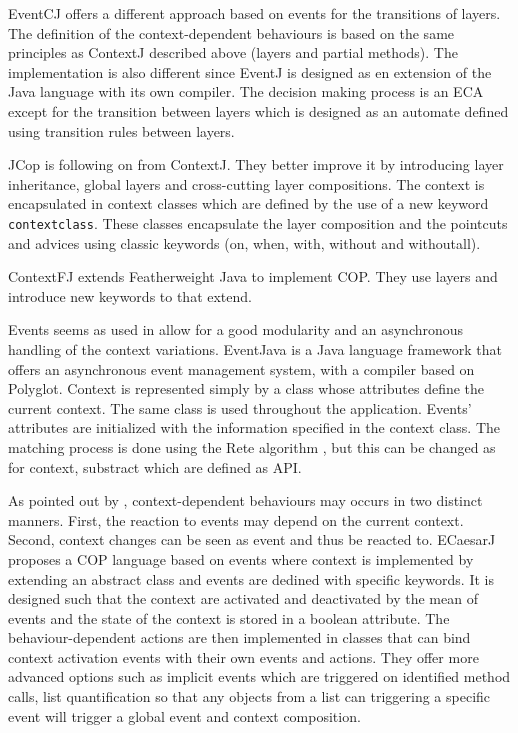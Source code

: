 \documentclass[a4paper]{article}
\begin{document}
EventCJ \cite{kamina_eventcj:_2011} offers a different approach based on events for the transitions of layers. The definition of the context-dependent behaviours is based on the same principles as ContextJ described above (layers and partial methods). The implementation is also different since EventJ is designed as en extension of the Java language with its own compiler. The decision making process is an ECA except for the transition between layers which is designed as an automate defined using transition rules between layers.


JCop \cite{appeltauer_declarative_2013} is following on from ContextJ. They better improve it by introducing layer inheritance, global layers and cross-cutting layer compositions. The context is encapsulated in context classes which are defined by the use of a new keyword \lstinline|contextclass|. These classes encapsulate the layer composition and the pointcuts and advices using classic keywords (on, when, with, without and withoutall). 

ContextFJ \cite{clarke_semantics_2009} extends Featherweight Java \cite{} to implement COP. They use layers and introduce new keywords to that extend.

Events seems as used in \cite{kamina_eventcj:_2011} allow for a good modularity and an asynchronous handling of the context variations. EventJava \cite{jayaram_context-oriented_2009} is a Java language framework that offers an asynchronous event management system, with a compiler based on Polyglot. Context is represented simply by a class whose attributes define the current context. The same class is used throughout the application. Events' attributes are initialized with the information specified in the context class. The matching process is done using the Rete algorithm \cite{}, but this can be changed as for context, substract which are defined as API. 

As pointed out by \cite{nunez_declarative_2009}, context-dependent behaviours may occurs in two distinct manners. First, the reaction to events may depend on the current context. Second, context changes can be seen as event and thus be reacted to. ECaesarJ \cite{nunez_declarative_2009} proposes a COP language based on events where context is implemented by extending an abstract class and events are dedined with specific keywords. It is designed such that the context are activated and deactivated by the mean of events and the state of the context is stored in a boolean attribute. The behaviour-dependent actions are then implemented in classes that can bind context activation events with their own events and actions. They offer more advanced options such as implicit events which are triggered on identified method calls, list quantification so that any objects from a list can triggering a specific event will trigger a global event and context composition.
\end{document}
